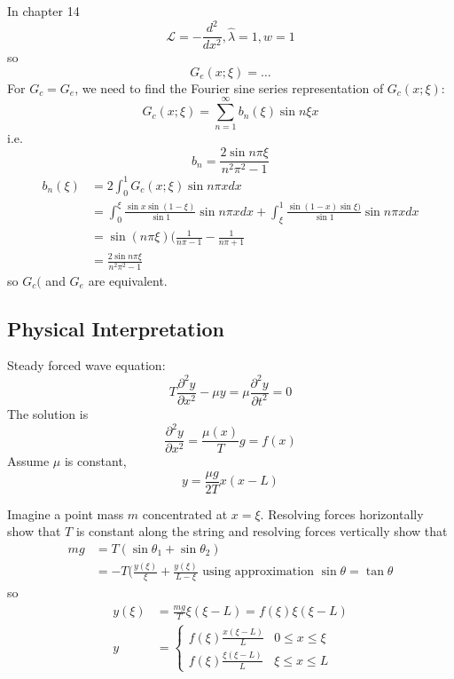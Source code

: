\documentclass[a4paper]{article}
\renewcommand*{\L}{\mathcal{L}}
\begin{document}
In chapter 14
\[
  \L = - \frac{d^2}{dx^2}, \hat \lambda = 1, w = 1
\]
so
\[
  G_e(x; \xi) = \dots
\]
For \(G_c = G_e\), we need to find the Fourier sine series representation of \(G_c(x; \xi)\):
\[
  G_c(x; \xi) = \sum_{n = 1}^{\infty} b_n(\xi) \sin n\xi x
\]
i.e.
\[
  b_n = \frac{2 \sin n\pi\xi}{n^2\pi^2 - 1}
\]
\begin{align*}
  b_n(\xi) &= 2 \int_{0}^{1} G_c(x; \xi) \sin n\pi x dx \\
           &= \int_{0}^{\xi} \frac{\sin x \sin(1 - \xi)}{\sin 1} \sin n \pi x dx + \int_{\xi}^{1} \frac{\sin (1 - x) \sin \xi)}{\sin 1} \sin n \pi x dx \\
           &= \sin (n\pi\xi) (\frac{1}{n\pi - 1} - \frac{1}{n\pi + 1} \\
           &= \frac{2 \sin n\pi\xi}{n^2\pi^2 - 1}
\end{align*}
so \(G_c(\) and \(G_e\) are equivalent.

\subsection{Physical Interpretation}

Steady forced wave equation:
\[
  T \frac{\partial^2 y}{\partial x^2} - \mu y = \mu \frac{\partial^2 y}{\partial t^2} = 0
\]
The solution is
\[
  \frac{\partial^2 y}{\partial x^2} = \frac{\mu(x)}{T}g = f(x)
\]
Assume \(\mu\) is constant,
\[
  y = \frac{\mu g}{2T}x(x - L)
\]

Imagine a point mass \(m\) concentrated at \(x = \xi\). Resolving forces horizontally show that \(T\) is constant along the string and resolving forces vertically show that
\begin{align*}
  mg &= T(\sin \theta_1 + \sin \theta_2) \\
     &= -T(\frac{y(\xi)}{\xi} + \frac{y(\xi)}{L - \xi} \text{ using approximation } \sin \theta = \tan \theta
\end{align*}
so
\begin{align*}
  y(\xi) &= \frac{mg}{T} \xi(\xi - L) = f(\xi) \xi (\xi -L) \\
  y &=
      \begin{cases}
        f(\xi) \frac{x (\xi - L)}{L} & 0 \leq x \leq \xi \\
        f(\xi) \frac{\xi (\xi - L)}{L} & \xi \leq x \leq L
      \end{cases}
\end{align*}
\end{document}
